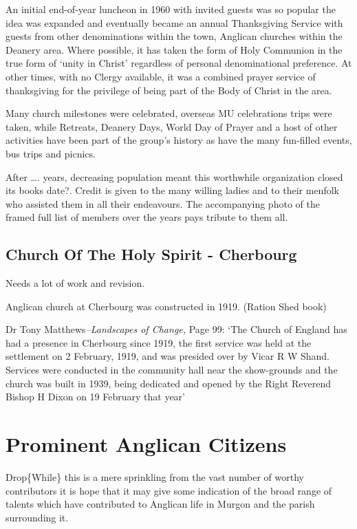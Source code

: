 An initial end-of-year luncheon in 1960 with invited guests was so popular the idea was expanded and eventually became an annual Thanksgiving Service with guests from other denominations within the town, Anglican churches within the Deanery area. Where possible, it has taken the form of Holy Communion in the true form of `unity in Christ' regardless of personal denominational preference. At other times, with no Clergy available, it was a combined prayer service of thanksgiving for the privilege of being part of the Body of Christ in the area.

Many church milestones were celebrated, overseas MU celebrations trips were taken, while Retreats, Deanery Days, World Day of Prayer and a host of other activities have been part of the group's history as have the many fun-filled events, bus trips and picnics.

After \ldots. years, decreasing population meant this worthwhile organization closed its books date?. Credit is given to the many willing ladies and to their menfolk who assisted them in all their endeavours. The accompanying photo of the framed full list of members over the years pays tribute to them all.

\hypertarget{church-of-the-holy-spirit---cherbourg}{%
\section{Church Of The Holy Spirit - Cherbourg}\label{church-of-the-holy-spirit---cherbourg}}

Needs a lot of work and revision.

Anglican church at Cherbourg was constructed in 1919. (Ration Shed book)

Dr Tony Matthews\emph{--Landscapes of Change,} Page 99: `The Church of England has had a presence in Cherbourg since 1919, the first service was held at the settlement on 2 February, 1919, and was presided over by Vicar R W Shand. Services were conducted in the community hall near the show-grounds and the church was built in 1939, being dedicated and opened by the Right Reverend Bishop H Dixon on 19 February that year'

\hypertarget{prominent-anglican-citizens}{%
\chapter{Prominent Anglican Citizens}\label{prominent-anglican-citizens}}

Drop\{While\} this is a mere sprinkling from the vast number of worthy contributors it is hope that it may give some indication of the broad range of talents which have contributed to Anglican life in Murgon and the parish surrounding it.


